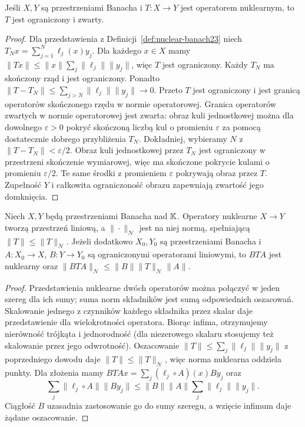 \begin{twierdzenie}
\label{thm:nuclear-compact23}
Jeśli $X,Y$ są przestrzeniami Banacha i $T:X\to Y$
jest operatorem nuklearnym, to $T$ jest ograniczony i zwarty.
\end{twierdzenie}
\begin{proof}
Dla przedstawienia z Definicji~\ref{def:nuclear-banach23}
niech $T_Nx=\sum_{j=1}^N\ell_j(x)y_j$.
Dla każdego $x\in X$ mamy
$\|Tx\|\le\|x\|\sum_j\|\ell_j\|\|y_j\|$,
więc $T$ jest ograniczony. Każdy $T_N$ ma skończony
rząd i jest ograniczony. Ponadto
$\|T-T_N\|\le\sum_{j>N}\|\ell_j\|\|y_j\|\to0$.
Przeto $T$ jest ograniczony i jest granicą operatorów
skończonego rzędu w normie operatorowej. Granica
operatorów zwartych w normie operatorowej jest zwarta:
obraz kuli jednostkowej można dla dowolnego $\varepsilon>0$
pokryć skończoną liczbą kul o promieniu $\varepsilon$
za pomocą dostatecznie dobrego przybliżenia $T_N$.
Dokładniej, wybieramy $N$ z $\|T-T_N\|<\varepsilon/2$.
Obraz kuli jednostkowej przez $T_N$ jest ograniczony
w przestrzeni skończenie wymiarowej, więc ma skończone
pokrycie kulami o promieniu $\varepsilon/2$.
Te same środki z promieniem $\varepsilon$ pokrywają
obraz przez $T$. Zupełność $Y$ i całkowita ograniczoność
obrazu zapewniają zwartość jego domknięcia.
\end{proof}

\begin{stwierdzenie}
\label{prop:nuclear-ideal23}
Niech $X,Y$ będą przestrzeniami Banacha nad $\mathbb K$.
Operatory nuklearne $X\to Y$ tworzą przestrzeń liniową,
a $\|\cdot\|_{\mathcal N}$ jest na niej normą,
spełniającą $\|T\|\le\|T\|_{\mathcal N}$.
Jeżeli dodatkowo $X_0,Y_0$ są przestrzeniami Banacha
i $A:X_0\to X$, $B:Y\to Y_0$ są ograniczonymi
operatorami liniowymi, to $BTA$ jest nuklearny oraz
$\|BTA\|_{\mathcal N}\le\|B\|\|T\|_{\mathcal N}\|A\|$.
\end{stwierdzenie}
\begin{proof}
Przedstawienia nuklearne dwóch operatorów można połączyć
w jeden szereg dla ich sumy; suma norm składników jest
sumą odpowiednich oszacowań. Skalowanie jednego z czynników
każdego składnika przez skalar daje przedstawienie
dla wielokrotności operatora. Biorąc infima, otrzymujemy
nierówność trójkąta i jednorodność (dla niezerowego
skalaru stosujemy też skalowanie przez jego odwrotność).
Oszacowanie $\|T\|\le\sum_j\|\ell_j\|\|y_j\|$
z poprzedniego dowodu daje $\|T\|\le\|T\|_{\mathcal N}$,
więc norma nuklearna oddziela punkty.
Dla złożenia mamy
$BTAx=\sum_j(\ell_j\circ A)(x)By_j$ oraz
\[
 \sum_j\|\ell_j\circ A\|\|By_j\|
 \le\|B\|\|A\|\sum_j\|\ell_j\|\|y_j\|.
\]
Ciągłość $B$ uzasadnia zastosowanie go do sumy szeregu,
a wzięcie infimum daje żądane oszacowanie.
\end{proof}

